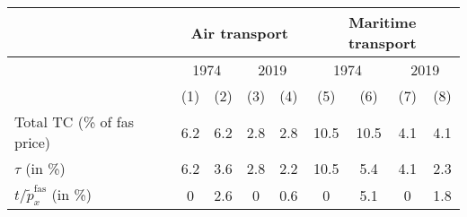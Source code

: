 \begin{tabular}{l|cc|cc||cc|cc}
& \multicolumn{4}{|c||}{Air transport} & \multicolumn{4}{|c}{Maritime transport} \\ \hline
& \multicolumn{2}{|c|}{1974} & \multicolumn{2}{|c||}{2019} & \multicolumn{2}{|c|}{1974} & \multicolumn{2}{|c}{2019}\\
& (1) & (2) &  (3) & (4) & (5) & (6) &  (7) & (8)\\ \hline
Total TC (\% of fas price) & 6.2 & 6.2 & 2.8 & 2.8 & 10.5 & 10.5 & 4.1 & 4.1 \\
$\tau$ (in \%) & 6.2 & 3.6 & 2.8 & 2.2 & 10.5 & 5.4 & 4.1 & 2.3\\
$t/\widetilde{p}^{\text{fas}}_x$ (in \%) & 0 & 2.6 & 0 & 0.6 & 0 & 5.1 & 0 & 1.8\\
\hline \hline
\end{tabular} 